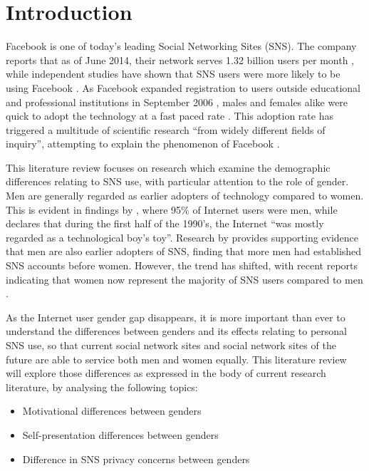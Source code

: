 \section{Introduction}

Facebook is one of today's leading Social Networking Sites (SNS). The company reports that as of June 2014, their network serves 1.32 billion users per month \citep{Facebook2014}, while independent studies have shown that SNS users were more likely to be using Facebook \citep{Hampton2011, Raacke2008, Hargittai2007}. As Facebook expanded registration to users outside educational and professional institutions in September 2006 \citep{Facebook2014}, males and females alike were quick to adopt the technology at a fast paced rate \citep{Mazman2011}. This adoption rate has triggered a multitude of scientific research ``from widely different fields of inquiry'', attempting to explain the phenomenon of Facebook \citep[p. 983]{Caers2013}. 

This literature review focuses on research which examine the demographic differences relating to SNS use, with particular attention to the role of gender. Men are generally regarded as earlier adopters of technology compared to women. This is evident in findings by \citet{Pitkow1994}, where 95\% of Internet users were men, while \citet[p. 896]{Kimbrough2013} declares that during the first half of the 1990's, the Internet ``was mostly regarded as a technological boy's toy''. %
Research by \citet{Fogel2009} provides supporting evidence that men are also earlier adopters of SNS, finding that more men had established SNS accounts before women. However, the trend has shifted, with recent reports indicating that women now represent the majority of SNS users compared to men \citep{Duggan2013, Hampton2011}.

As the Internet user gender gap disappears, it is more important than ever to understand the differences between genders and its effects relating to personal SNS use, so that current social network sites and social network sites of the future are able to service both men and women equally. This literature review will explore those differences as expressed in the body of current research literature, by analysing the following topics:
\begin{itemize}
\item Motivational differences between genders
\item Self-presentation differences between genders
\item Difference in SNS privacy concerns between genders
\end{itemize}